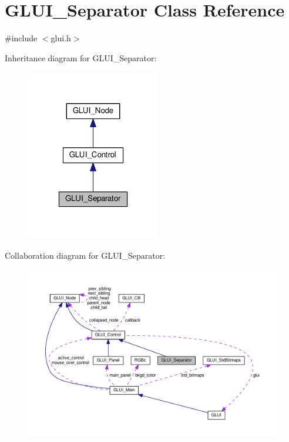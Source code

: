 \hypertarget{class_g_l_u_i___separator}{\section{G\+L\+U\+I\+\_\+\+Separator Class Reference}
\label{class_g_l_u_i___separator}
}


{\ttfamily \#include $<$glui.\+h$>$}



Inheritance diagram for G\+L\+U\+I\+\_\+\+Separator\+:\nopagebreak
\begin{figure}[H]
\begin{center}
\leavevmode
\includegraphics[width=166pt]{class_g_l_u_i___separator__inherit__graph}
\end{center}
\end{figure}


Collaboration diagram for G\+L\+U\+I\+\_\+\+Separator\+:\nopagebreak
\begin{figure}[H]
\begin{center}
\leavevmode
\includegraphics[width=350pt]{class_g_l_u_i___separator__coll__graph}
\end{center}
\end{figure}
